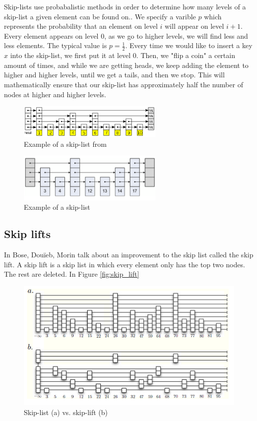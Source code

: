 \documentclass[oribibl]{llncs}
\begin{document}
Skip-lists use probabalistic methods in order to determine how many levels of a skip-list a given element can be found on.. We specify a varible $p$ which represents the probability that an element on level $i$ will appear on level $i+1$. Every element appears on level 0, as we go to higher levels, we will find less and less elements. The typical value is $p=\frac{1}{2}$. Every time we would like to insert a key $x$ into the skip-list, we first put it at level 0. Then, we "flip a coin" a certain amount of times, and while we are getting heads, we keep adding the element to higher and higher levels, until we get a tails, and then we stop. This will mathematically ensure that our skip-list has approximately half the number of nodes at higher and higher levels.



\begin{figure}[here]
\center
\includegraphics[width=7cm]{images/skip_list}
\caption{Example of a skip-list from \cite{skip_list}}
\label{fig:skip_list}
\end{figure}

\begin{figure}[here]
\center
\includegraphics[width=7cm]{images/skip_list1}
\caption{Example of a skip-list}
\label{fig:skip_list}
\end{figure}

\subsection{Skip lifts}

In \cite{skip_lift} Bose, Douïeb, Morin talk about an improvement to the skip list called the skip lift. A skip lift is a skip list in which every element only has the top two nodes. The rest are deleted. In Figure \ref{fig:skip_lift} 

\begin{figure}[here]
\center
\includegraphics[width=12cm]{images/skiplist_vs_skiplift}
\caption{Skip-list (a)  vs. skip-lift (b)}
\label{fig:skiplist_vs_skiplift}
\end{figure}
\end{document}
